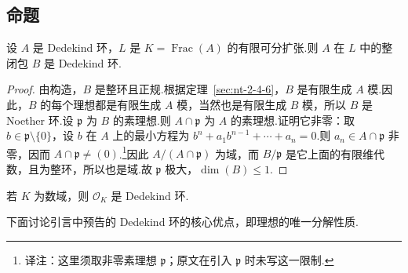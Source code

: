 \subsection{命题}\label{sec:nt-3-3-2}
\begin{proposition*}
设 $A$ 是 Dedekind 环，$L$ 是 $K=\operatorname{Frac}(A)$ 的有限可分扩张.则 $A$ 在 $L$ 中的整闭包 $B$ 是 Dedekind 环.
\end{proposition*}
\begin{proof}
由构造，$B$ 是整环且正规.根据定理~\ref{sec:nt-2-4-6}，$B$ 是有限生成 $A$ 模.因此，$B$ 的每个理想都是有限生成 $A$ 模，当然也是有限生成 $B$ 模，所以 $B$ 是 Noether 环.设 $\mathfrak p$ 为 $B$ 的素理想.则 $A\cap\mathfrak p$ 为 $A$ 的素理想.证明它非零：取 $b\in\mathfrak p\setminus\{0\}$，设 $b$ 在 $A$ 上的最小方程为 $b^n+a_1b^{n-1}+\cdots+a_n=0$.则 $a_n\in A\cap\mathfrak p$ 非零，因而 $A\cap\mathfrak p\ne(0)$.\footnote{译注：这里须取非零素理想 $\mathfrak p$；原文在引入 $\mathfrak p$ 时未写这一限制.}因此 $A/(A\cap\mathfrak p)$ 为域，而 $B/\mathfrak p$ 是它上面的有限维代数，且为整环，所以也是域.故 $\mathfrak p$ 极大，$\dim(B)\le1$.
\end{proof}
\begin{example*}
若 $K$ 为数域，则 $\mathcal O_K$ 是 Dedekind 环.
\end{example*}
下面讨论引言中预告的 Dedekind 环的核心优点，即理想的唯一分解性质.
